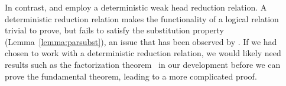 \documentclass[\ifpublic nolinenum\else\fi,online,OA]{jfp}
\theoremstyle{definition}
\begin{document}
In contrast, \citet{decagda} and \citet{nbeincoq} employ a deterministic weak
head reduction relation. %
A deterministic reduction relation makes
the functionality of a logical relation trivial to prove, but fails to
satisfy the substitution property (Lemma~\ref{lemma:parsubst}), an
issue that has been observed by
\citet{casinghino:combining-proofs-programs}. If we had chosen to work
with a deterministic reduction relation, we would likely need
results such as the factorization theorem~\citep{takahashi-parallel-reduction,factorization-essentially} in our development before we
can prove the fundamental theorem, leading to a more complicated proof.


\end{document}
